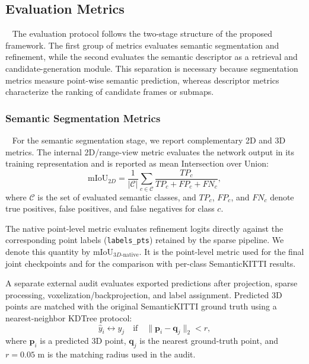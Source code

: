 \subsection{Evaluation Metrics}~\label{subsec:evaluation-metrics}
The evaluation protocol follows the two-stage structure of the proposed framework. The first group of metrics evaluates semantic segmentation and refinement, while the second evaluates the semantic descriptor as a retrieval and candidate-generation module. This separation is necessary because segmentation metrics measure point-wise semantic prediction, whereas descriptor metrics characterize the ranking of candidate frames or submaps. \\

\subsubsection{Semantic Segmentation Metrics} ~\label{subsubsec:semantic-segmentation-metric}
For the semantic segmentation stage, we report complementary 2D and 3D metrics. The internal 2D/range-view metric evaluates the network output in its training representation and is reported as mean Intersection over Union:
\begin{equation}
    \mathrm{mIoU}_{2D} = \frac{1}{|\mathcal{C}|}\sum_{c \in \mathcal{C}}
    \frac{TP_c}{TP_c + FP_c + FN_c},
\end{equation}
where $\mathcal{C}$ is the set of evaluated semantic classes, and $TP_c$, $FP_c$, and $FN_c$ denote true positives, false positives, and false negatives for class $c$.

The native point-level metric evaluates refinement logits directly against the corresponding point labels (\texttt{labels\_pts}) retained by the sparse pipeline. We denote this quantity by $\mathrm{mIoU}_{3D\text{-native}}$. It is the point-level metric used for the final joint checkpoints and for the comparison with per-class SemanticKITTI results.

A separate external audit evaluates exported predictions after projection, sparse processing, voxelization/backprojection, and label assignment. Predicted 3D points are matched with the original SemanticKITTI ground truth using a nearest-neighbor KDTree protocol:
\begin{equation}
    \hat{y}_i \leftrightarrow y_j
    \quad \text{if} \quad
    \|\mathbf{p}_i - \mathbf{q}_j\|_2 < r,
\end{equation}
where $\mathbf{p}_i$ is a predicted 3D point, $\mathbf{q}_j$ is the nearest ground-truth point, and $r=0.05$ m is the matching radius used in the audit.

